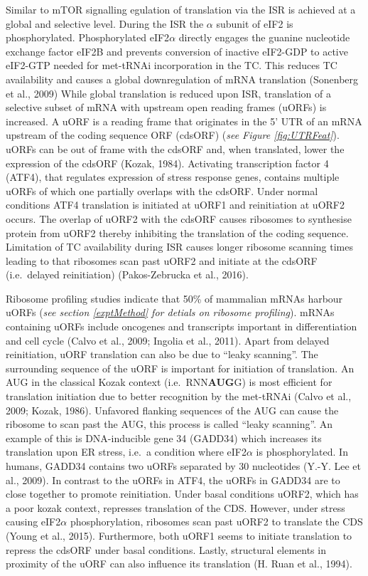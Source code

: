 \documentclass[12pt,openany]{book}
\begin{document}
Similar to mTOR signalling egulation of translation via the ISR is
achieved at a global and selective level. During the ISR the \(\alpha\)
subunit of eIF2 is phosphorylated. Phosphorylated eIF2\(\alpha\)
directly engages the guanine nucleotide exchange factor eIF2B and
prevents conversion of inactive eIF2-GDP to active eIF2-GTP needed for
met-tRNAi incorporation in the TC. This reduces TC availability and
causes a global downregulation of mRNA translation (Sonenberg et al.,
2009) While global translation is reduced upon ISR, translation of a
selective subset of mRNA with upstream open reading frames (uORFs) is
increased. A uORF is a reading frame that originates in the 5' UTR of an
mRNA upstream of the coding sequence ORF (cdsORF) (\emph{see Figure
\ref{fig:UTRFeat}}). uORFs can be out of frame with the cdsORF and, when
translated, lower the expression of the cdsORF (Kozak, 1984). Activating
transcription factor 4 (ATF4), that regulates expression of stress
response genes, contains multiple uORFs of which one partially overlaps
with the cdsORF. Under normal conditions ATF4 translation is initiated
at uORF1 and reinitiation at uORF2 occurs. The overlap of uORF2 with the
cdsORF causes ribosomes to synthesise protein from uORF2 thereby
inhibiting the translation of the coding sequence. Limitation of TC
availability during ISR causes longer ribosome scanning times leading to
that ribosomes scan past uORF2 and initiate at the cdsORF (i.e.~delayed
reinitiation) (Pakos-Zebrucka et al., 2016).

Ribosome profiling studies indicate that 50\% of mammalian mRNAs harbour
uORFs (\emph{see section \ref{exptMethod} for detials on ribosome
profiling}). mRNAs containing uORFs include oncogenes and transcripts
important in differentiation and cell cycle (Calvo et al., 2009; Ingolia
et al., 2011). Apart from delayed reinitiation, uORF translation can
also be due to ``leaky scanning''. The surrounding sequence of the uORF
is important for initiation of translation. An AUG in the classical
Kozak context (i.e.~RNN\textbf{AUG}G) is most efficient for translation
initiation due to better recognition by the met-tRNAi (Calvo et al.,
2009; Kozak, 1986). Unfavored flanking sequences of the AUG can cause
the ribosome to scan past the AUG, this process is called ``leaky
scanning''. An example of this is DNA-inducible gene 34 (GADD34) which
increases its translation upon ER stress, i.e.~a condition where
eIF2\(\alpha\) is phosphorylated. In humans, GADD34 contains two uORFs
separated by 30 nucleotides (Y.-Y. Lee et al., 2009). In contrast to the
uORFs in ATF4, the uORFs in GADD34 are to close together to promote
reinitiation. Under basal conditions uORF2, which has a poor kozak
context, represses translation of the CDS. However, under stress causing
eIF2\(\alpha\) phosphorylation, ribosomes scan past uORF2 to translate
the CDS (Young et al., 2015). Furthermore, both uORF1 seems to initiate
translation to repress the cdsORF under basal conditions. Lastly,
structural elements in proximity of the uORF can also influence its
translation (H. Ruan et al., 1994).
\end{document}
